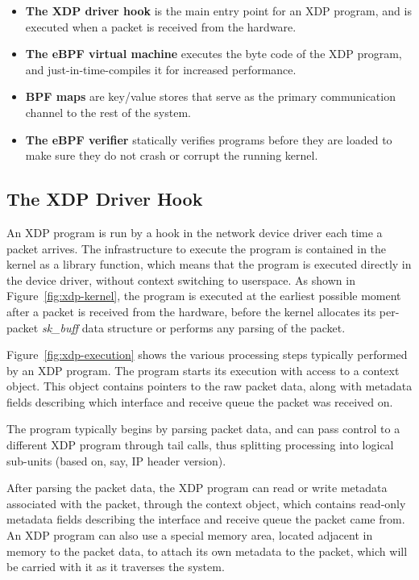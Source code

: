 \documentclass[sigconf]{acmart}
\begin{document}
\begin{itemize}
\item \textbf{The XDP driver hook} is the main entry point for an XDP program,
  and is executed when a packet is received from the hardware.

\item \textbf{The eBPF virtual machine} executes the byte code of the XDP
  program, and just-in-time-compiles it for increased performance.

\item \textbf{BPF maps} are key/value stores that serve as the primary
  communication channel to the rest of the system.

\item \textbf{The eBPF verifier} statically verifies programs before they are
  loaded to make sure they do not crash or corrupt the running kernel.
\end{itemize}


\subsection{The XDP Driver Hook}
\label{sec:prog-model}


An XDP program is run by a hook in the network device driver each time a packet
arrives. The infrastructure to execute the program is contained in the kernel as
a library function, which means that the program is executed directly in the
device driver, without context switching to userspace. As shown in
Figure~\ref{fig:xdp-kernel}, the program is executed at the earliest possible
moment after a packet is received from the hardware, before the kernel allocates
its per-packet \emph{sk\_buff} data structure or performs any parsing of the
packet.

Figure~\ref{fig:xdp-execution} shows the various processing steps typically
performed by an XDP program. The program starts its execution with access to a
context object. This object contains pointers to the raw packet data, along with
metadata fields describing which interface and receive queue the packet was
received on.

The program typically begins by parsing packet data, and can pass control to a
different XDP program through tail calls, thus splitting processing into logical
sub-units (based on, say, IP header version).

After parsing the packet data, the XDP program can read or write metadata
associated with the packet, through the context object, which contains read-only
metadata fields describing the interface and receive queue the packet came from.
An XDP program can also use a special memory area, located adjacent in memory to
the packet data, to attach its own metadata to the packet, which will be carried
with it as it traverses the system.
\end{document}
